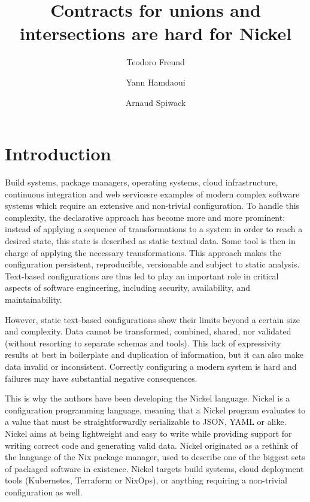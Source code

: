 \documentclass[sigplan,10pt,review,anonymous]{acmart}
\title{Contracts for unions and intersections are hard for Nickel}
\author{Teodoro Freund}
\affiliation{
  \institution{???}
  \city{Buenos Aires}
  \country{Argentina}
}
\author{Yann Hamdaoui}
\affiliation{
  \institution{Tweag}
  \city{Paris}
  \country{France}
}
\author{Arnaud Spiwack}
\affiliation{
  \institution{Tweag}
  \city{Paris}
  \country{France}
}
\newcommand{\unsure}[2][1=]{}
\newcommand{\info}[2][1=]{}
\newcommand{\resolved}[2]{}
\begin{document}
\maketitle

\unsure{TODO: CCS classification; Keywords}
\section{Introduction}
\info{Goals of the paper: position paper: unions/intersections nice in
theory problematic in practice. In particular non-orthogonal with the
rest of the features of your language.}

Build systems, package managers, operating systems, cloud infrastructure,
continuous integration and web services\resolved{Also continuous integration}
are examples of modern complex software systems which require an extensive and
non-trivial configuration. To handle this complexity, the declarative approach
has become more and more prominent: instead of applying a sequence of
transformations to a system in order to reach a desired state, this state is
described as static textual data. Some tool is then in charge of applying the
necessary transformations. This approach makes the configuration persistent,
reproducible, versionable and subject to static analysis. Text-based
configurations are thus led to play an important role in critical aspects of
software engineering, including security, availability, and maintainability.

However, static text-based configurations show their limits beyond a certain
size and complexity. Data cannot be transformed, combined, shared, nor validated
(without resorting to separate schemas and tools).  This lack of expressivity
results at best in boilerplate and duplication of information, but it can also
make data invalid or inconsistent.  Correctly configuring a modern system is hard
and failures may have substantial negative consequences.

This is why the authors have been developing the Nickel
language\cite{NickelRepo}. Nickel is a configuration programming language,
meaning that a Nickel program evaluates to a value that must be
straightforwardly serializable to JSON, YAML or alike. Nickel aims at being
lightweight and easy to write while providing support for writing correct code
and generating valid data. Nickel originated as a rethink of the language of the
Nix package manager, used to describe one of the biggest sets of packaged
software in existence\cite{repology}.  Nickel targets build systems, cloud
deployment tools (Kubernetes, Terraform or NixOps), or anything requiring a
non-trivial configuration as well.
\end{document}
